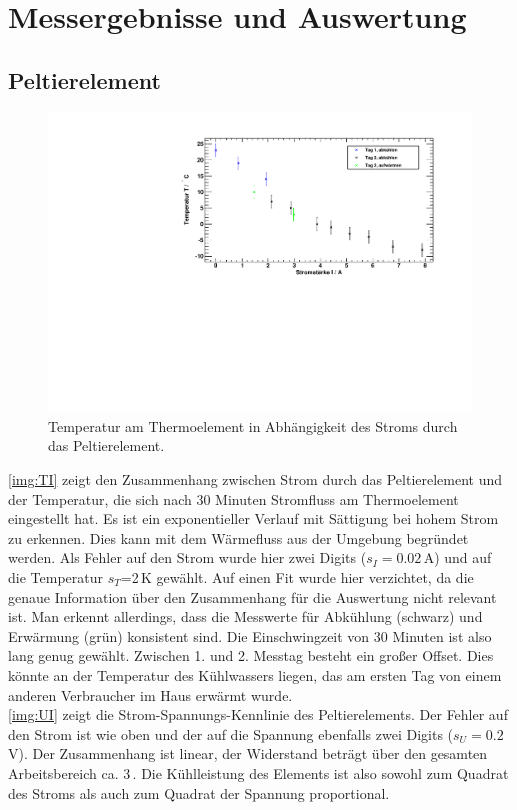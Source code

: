 \section{Messergebnisse und Auswertung}
\subsection{Peltierelement}

\begin{figure}[H]
\begin{center} 
  \includegraphics[width=\textwidth]{../img/graph_T-I.pdf}
  \caption{Temperatur am Thermoelement
  in Abhängigkeit des Stroms durch das Peltierelement.}
  \label{img:TI}
\end{center}
\end{figure}

\autoref{img:TI} zeigt den Zusammenhang zwischen Strom durch das Peltierelement
und der Temperatur, die sich nach 30 Minuten Stromfluss am Thermoelement eingestellt hat.
Es ist ein exponentieller Verlauf mit Sättigung bei hohem Strom zu erkennen.
Dies kann mit dem Wärmefluss aus der Umgebung begründet werden.
Als Fehler auf den Strom wurde hier zwei Digits ($s_I=0.02$\,A) und auf die Temperatur $s_T$=2\,K gewählt.
Auf einen Fit wurde hier verzichtet, da die genaue Information über den Zusammenhang
für die Auswertung nicht relevant ist.
Man erkennt allerdings, dass die Messwerte für Abkühlung (schwarz) und Erwärmung (grün) konsistent sind.
Die Einschwingzeit von 30 Minuten ist also lang genug gewählt.
Zwischen 1. und 2. Messtag besteht ein großer Offset.
Dies könnte an der Temperatur des Kühlwassers liegen,
das am ersten Tag von einem anderen Verbraucher im Haus erwärmt wurde.\\
\autoref{img:UI} zeigt die Strom-Spannungs-Kennlinie des Peltierelements.
Der Fehler auf den Strom ist wie oben und der auf die Spannung ebenfalls zwei Digits ($s_U=0.2$\,V).
Der Zusammenhang ist linear, der Widerstand beträgt über den gesamten Arbeitsbereich ca. 3\,\textOmega.
Die Kühlleistung des Elements ist also sowohl zum Quadrat des Stroms als auch zum Quadrat der Spannung proportional.




